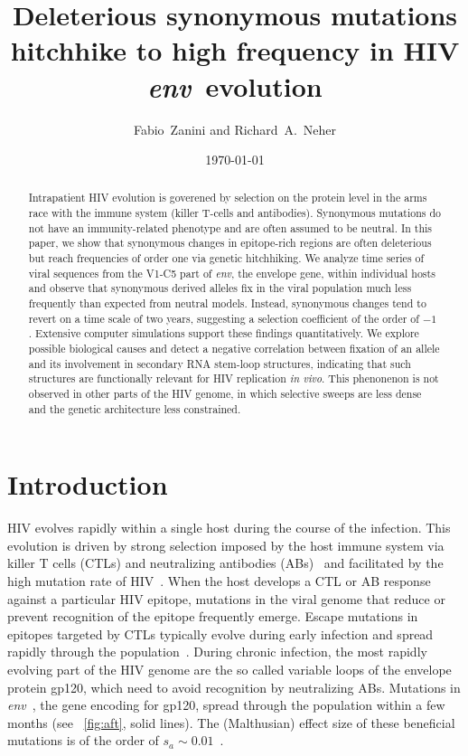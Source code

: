 \documentclass[rmp, twocolumn]{revtex4}
\newcommand{\Author}{Fabio~Zanini and Richard~A.~Neher}
\newcommand{\Title}{Deleterious synonymous mutations hitchhike to high frequency in HIV \env~evolution}
\newcommand{\env}{\textit{env}}
\begin{document}
\title{\Title}
\author{\Author}
\date{\today}

\begin{abstract}
\noindent

Intrapatient HIV evolution is goverened by selection on the protein level in
the arms race with the immune system (killer T-cells and antibodies).
Synonymous mutations do not have an immunity-related phenotype and are often
assumed to be neutral. In this paper, we show that synonymous changes in
epitope-rich regions are often deleterious but reach frequencies of order one
via genetic hitchhiking.  We analyze time series of viral sequences from the
V1-C5 part of {\it env}, the envelope gene, within individual hosts and observe
that synonymous derived alleles fix in the viral population much less
frequently than expected from neutral models. Instead, synonymous changes tend
to revert on a time scale of two years, suggesting a selection coefficient of the
order of $-1~$\textperthousand. Extensive computer simulations support these
findings quantitatively. We explore possible biological causes and detect a
negative correlation between fixation of an allele and its involvement in
secondary RNA stem-loop structures, indicating that such structures are
functionally relevant for HIV replication {\it in vivo}. This phenonenon is not
observed in other parts of the HIV genome, in which selective sweeps are less
dense and the genetic architecture less constrained.

\end{abstract}
\maketitle

\section{Introduction}

HIV evolves rapidly within a single host during the course of the infection.
This evolution is driven by strong selection imposed by the host immune system
via killer T cells (CTLs) and neutralizing antibodies
(ABs)~\citep{pantaleo_immunopathogenesis_1996} and facilitated by the high
mutation rate of HIV~\citep{mansky_lower_1995}. When the host develops a CTL or
AB response against a particular HIV epitope, mutations in the viral genome that
reduce or prevent recognition of the epitope frequently emerge. Escape mutations
in epitopes targeted by CTLs typically evolve during early infection and spread
rapidly through the population~\citep{mcmichael_immune_2009}. During chronic
infection, the most rapidly evolving part of the HIV genome are the so called
variable loops of the envelope protein gp120, which need to avoid recognition by
neutralizing ABs.  Mutations in \env~, the gene encoding for gp120, spread
through the population within a few months (see \figurename~\ref{fig:aft}, solid
lines).  The (Malthusian) effect size of these beneficial mutations is of the
order of $s_a \sim 0.01$~\citep{neher_recombination_2010}.
\end{document}
